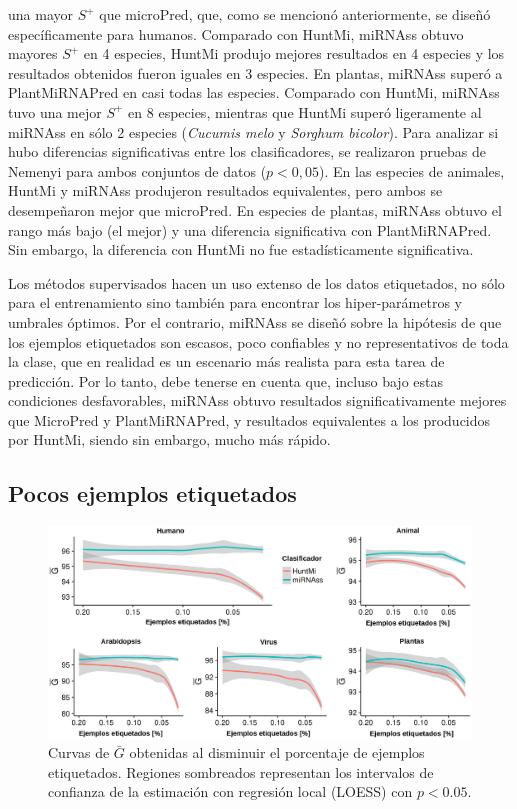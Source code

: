 una mayor $S^{+}$ que microPred, que, como se mencionó anteriormente, se diseñó específicamente para humanos. Comparado con HuntMi, miRNAss obtuvo mayores
$S^{+}$ en 4 especies, HuntMi produjo mejores resultados en 4 especies y los resultados obtenidos fueron iguales en 3 especies. En plantas, miRNAss superó a
PlantMiRNAPred en casi todas las especies. Comparado con HuntMi, miRNAss tuvo una mejor $S^{+}$ en 8 especies, mientras que HuntMi superó ligeramente al
miRNAss en sólo 2 especies (\textit{Cucumis melo} y \textit{Sorghum bicolor}).
Para analizar si hubo diferencias significativas entre los clasificadores, se realizaron pruebas de Nemenyi \citep{nemenyi1962distribution} para ambos
conjuntos de datos ($ p<0,05 $). En las especies de animales, HuntMi y miRNAss produjeron resultados equivalentes, pero ambos se desempeñaron mejor que
microPred. En especies de plantas, miRNAss obtuvo el rango más bajo (el mejor) y una diferencia significativa con PlantMiRNAPred. Sin embargo, la diferencia
con HuntMi no fue estadísticamente significativa.

Los métodos supervisados hacen un uso extenso de los datos etiquetados, no sólo para el entrenamiento sino también para encontrar los hiper-parámetros
y umbrales óptimos. Por el contrario, miRNAss se diseñó sobre la hipótesis de que los ejemplos etiquetados son escasos, poco confiables y no
representativos de toda la clase, que en realidad es un escenario más realista para esta tarea de predicción. Por lo tanto, debe tenerse en cuenta que,
incluso bajo estas condiciones desfavorables, miRNAss obtuvo resultados significativamente mejores que MicroPred y PlantMiRNAPred, y resultados equivalentes a
los producidos por HuntMi, siendo sin embargo, mucho más rápido.

\subsection*{Pocos ejemplos etiquetados}

\begin{figure}[t]
	\centering
	\includegraphics[width=\linewidth]{fig/few_labeled-huntmi.eps}
	\caption[$\bar{G}$ con pocos ejemplos de entrenamiento]{Curvas de $\bar{G}$ obtenidas al disminuir el porcentaje de ejemplos etiquetados. Regiones
		sombreados representan los intervalos de confianza de la estimación con regresión local (LOESS) con $p < 0.05$.}
	\label{fig:fewSamples:huntmi}
\end{figure}

